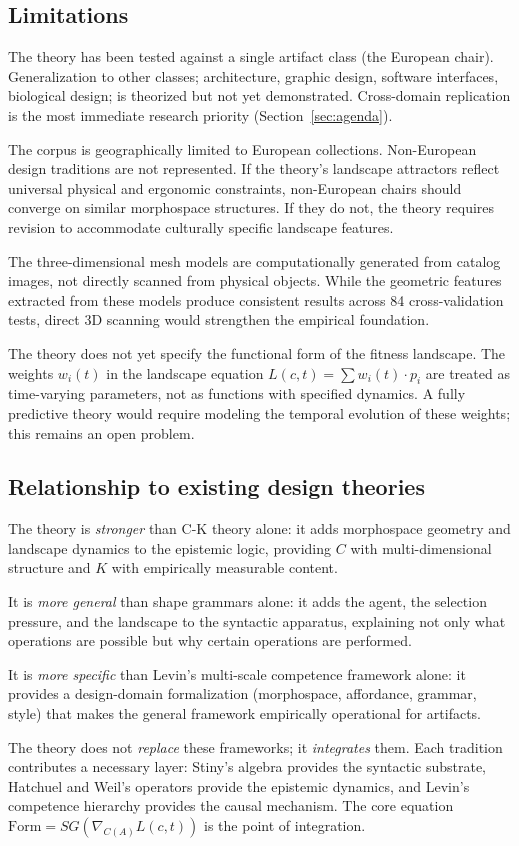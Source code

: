 \subsection{Limitations}

The theory has been tested against a single artifact class (the European chair). Generalization to other classes; architecture, graphic design, software interfaces, biological design; is theorized but not yet demonstrated. Cross-domain replication is the most immediate research priority (Section~\ref{sec:agenda}).

The corpus is geographically limited to European collections. Non-European design traditions are not represented. If the theory's landscape attractors reflect universal physical and ergonomic constraints, non-European chairs should converge on similar morphospace structures. If they do not, the theory requires revision to accommodate culturally specific landscape features.

The three-dimensional mesh models are computationally generated from catalog images, not directly scanned from physical objects. While the geometric features extracted from these models produce consistent results across 84 cross-validation tests, direct 3D scanning would strengthen the empirical foundation.

The theory does not yet specify the functional form of the fitness landscape. The weights $w_i(t)$ in the landscape equation $L(c,t) = \sum w_i(t) \cdot p_i$ are treated as time-varying parameters, not as functions with specified dynamics. A fully predictive theory would require modeling the temporal evolution of these weights; this remains an open problem.

\subsection{Relationship to existing design theories}

The theory is \textit{stronger} than C-K theory alone: it adds morphospace geometry and landscape dynamics to the epistemic logic, providing $C$ with multi-dimensional structure and $K$ with empirically measurable content.

It is \textit{more general} than shape grammars alone: it adds the agent, the selection pressure, and the landscape to the syntactic apparatus, explaining not only what operations are possible but why certain operations are performed.

It is \textit{more specific} than Levin's multi-scale competence framework alone: it provides a design-domain formalization (morphospace, affordance, grammar, style) that makes the general framework empirically operational for artifacts.

The theory does not \textit{replace} these frameworks; it \textit{integrates} them. Each tradition contributes a necessary layer: Stiny's algebra provides the syntactic substrate, Hatchuel and Weil's operators provide the epistemic dynamics, and Levin's competence hierarchy provides the causal mechanism. The core equation $\mathrm{Form} = SG(\nabla_{C(A)} L(c,t))$ is the point of integration.
